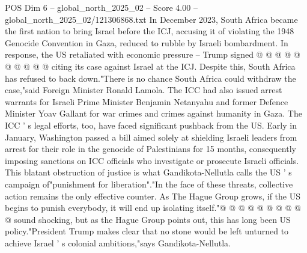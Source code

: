 \begin{textsample}{POS Dim 6 – global\_north\_2025\_02 – Score 4.00 – global\_north\_2025\_02/121306868.txt}
In December 2023, South Africa became the first nation to bring Israel before the ICJ, accusing it of violating the 1948 Genocide Convention in Gaza, reduced to rubble by Israeli bombardment.
In response, the US retaliated with economic pressure -- Trump signed @ @ @ @ @ @ @ @ @ @ citing its case against Israel at the ICJ.
Despite this, South Africa has refused to back down."There is no chance South Africa could withdraw the case,"said Foreign Minister Ronald Lamola.
The ICC had also issued arrest warrants for Israeli Prime Minister Benjamin Netanyahu and former Defence Minister Yoav Gallant for war crimes and crimes against humanity in Gaza.
The ICC ' s legal efforts, too, have faced significant pushback from the US.
Early in January, Washington passed a bill aimed solely at shielding Israeli leaders from arrest for their role in the genocide of Palestinians for 15 months, consequently imposing sanctions on ICC officials who investigate or prosecute Israeli officials.
This blatant obstruction of justice is what Gandikota-Nellutla calls the US ' s campaign of"punishment for liberation"."In the face of these threats, collective action remains the only effective counter.
As The Hague Group grows, if the US begins to punish everybody, it will end up isolating itself."@ @ @ @ @ @ @ @ @ @ sound shocking, but as the Hague Group points out, this has long been US policy."President Trump makes clear that no stone would be left unturned to achieve Israel ' s colonial ambitions,"says Gandikota-Nellutla.

\end{textsample}
